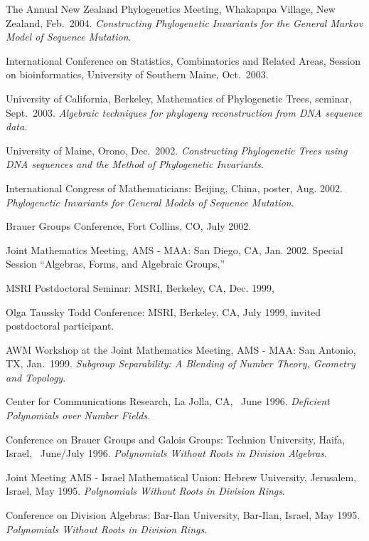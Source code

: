 \documentclass[10pt]{report}
\begin{document}
{The Annual New Zealand Phylogenetics Meeting, Whakapapa Village, New Zealand,
Feb.~2004. {\it Constructing Phylogenetic Invariants for the General
Markov Model of Sequence Mutation}.

International Conference on Statistics, Combinatorics and Related
Areas, Session on bioinformatics, University of Southern Maine,
Oct.~2003.

University of California, Berkeley, Mathematics of Phylogenetic Trees,
seminar, Sept.~2003. {\it Algebraic techniques for phylogeny
reconstruction from DNA sequence data}.

\newpage
University of Maine, Orono, Dec.~2002. {\it Constructing Phylogenetic
  Trees using DNA sequences and the Method of Phylogenetic
  Invariants}.

International Congress of Mathematicians: Beijing, China, poster,
Aug. 2002. {\it Phylogenetic Invariants for General Models of Sequence
Mutation}.

Brauer Groups Conference, Fort Collins, CO, July 2002.

Joint Mathematics Meeting, AMS - MAA: San Diego, CA, Jan. 2002.
Special Session ``Algebras, Forms, and Algebraic Groups,''

MSRI Postdoctoral Seminar: MSRI, Berkeley, CA, Dec. 1999,

Olga Taussky Todd Conference: MSRI, Berkeley, CA, July 1999,
invited postdoctoral participant.

AWM Workshop at the Joint Mathematics Meeting, AMS - MAA: San Antonio,
TX, Jan.~1999.
\emph{Subgroup Separability: A Blending of Number Theory, Geometry and
  Topology}.

Center for Communications Research, La Jolla, CA, \ June 1996.
{\it Deficient Polynomials over Number Fields}.

Conference on Brauer Groups and Galois Groups: Technion University,
Haifa, Israel, \ June/July 1996.
\emph{Polynomials Without Roots in Division Algebras}.

Joint Meeting AMS - Israel Mathematical Union: Hebrew University,
Jerusalem, Israel, May 1995. \emph{Polynomials Without Roots in Division
Rings}.

Conference on Division Algebras: Bar-Ilan University, Bar-Ilan, Israel,
May 1995.
\emph{Polynomials Without Roots in Division Rings}.


\mbox{}

}
\end{document}
